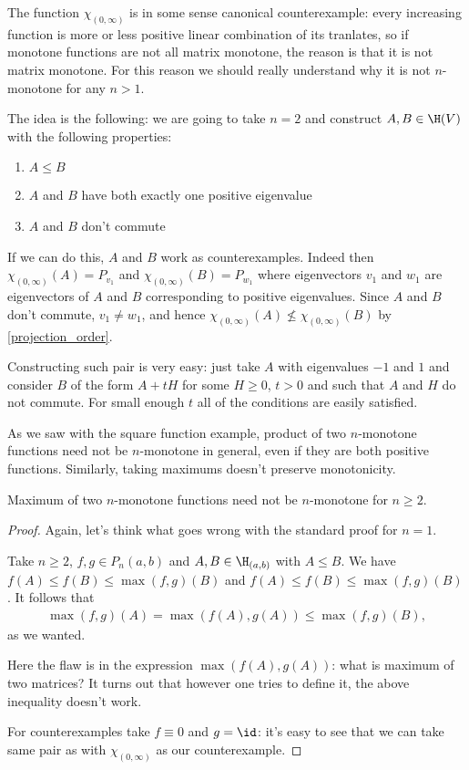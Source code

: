 The function $\chi_{(0, \infty)}$ is in some sense canonical counterexample: every increasing function is more or less positive linear combination of its tranlates, so if monotone functions are not all matrix monotone, the reason is that it is not matrix monotone. For this reason we should really understand why it is not $n$-monotone for any $n > 1$.

The idea is the following: we are going to take $n = 2$ and construct $A, B \in \H(V)$ with the following properties:
\begin{enumerate}
	\item $A \leq B$
	\item $A$ and $B$ have both exactly one positive eigenvalue
	\item $A$ and $B$ don't commute
\end{enumerate}
If we can do this, $A$ and $B$ work as counterexamples. Indeed then $\chi_{(0, \infty)}(A) = P_{v_{1}}$ and $\chi_{(0, \infty)}(B) = P_{w_{1}}$ where eigenvectors $v_{1}$ and $w_{1}$ are eigenvectors of $A$ and $B$ corresponding to positive eigenvalues. Since $A$ and $B$ don't commute, $v_{1} \neq w_{1}$, and hence $\chi_{(0, \infty)}(A) \not\leq \chi_{(0, \infty)}(B)$ by \ref{projection_order}.

Constructing such pair is very easy: just take $A$ with eigenvalues $-1$ and $1$ and consider $B$ of the form $A + t H$ for some $H \geq 0$, $t > 0$ and such that $A$ and $H$ do not commute. For small enough $t$ all of the conditions are easily satisfied.

As we saw with the square function example, product of two $n$-monotone functions need not be $n$-monotone in general, even if they are both positive functions. Similarly, taking maximums doesn't preserve monotonicity.

\begin{prop}
	Maximum of two $n$-monotone functions need not be $n$-monotone for $n \geq 2$.
\end{prop}
\begin{proof}
	Again, let's think what goes wrong with the standard proof for $n = 1$.

	Take $n \geq 2$, $f, g \in P_{n}(a, b)$ and $A, B \in \H_{(a, b)}$ with $A \leq B$. We have $f(A) \leq f(B) \leq \max(f, g)(B)$ and $f(A) \leq f(B) \leq \max(f, g)(B)$. It follows that
	\begin{align*}
		\max(f, g)(A) = \max(f(A), g(A)) \leq \max(f, g)(B),
	\end{align*}
	as we wanted.

	Here the flaw is in the expression $\max(f(A), g(A))$: what is maximum of two matrices? It turns out that however one tries to define it, the above inequality doesn't work.

	For counterexamples take $f \equiv 0$ and $g = \id$: it's easy to see that we can take same pair as with $\chi_{(0, \infty)}$ as our counterexample.
\end{proof}

